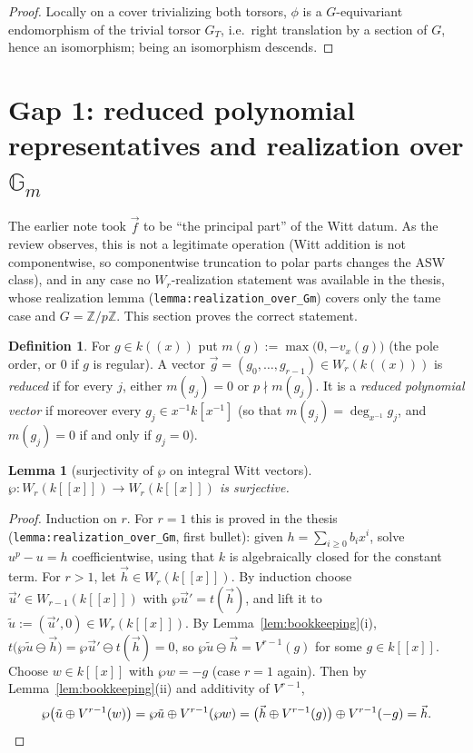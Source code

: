 \documentclass[11pt]{article}
\newcommand{\Z}{\mathbb{Z}}
\newcommand{\bG}{\mathbb{G}}
\newcommand{\AS}{\wp}
\newcommand{\vf}{\vec f}
\theoremstyle{plain}
\newtheorem{lemma}[theorem]{Lemma}
\theoremstyle{definition}
\newtheorem{definition}[theorem]{Definition}
\begin{document}
\begin{proof}
Locally on a cover trivializing both torsors, $\phi$ is a $G$-equivariant endomorphism of
the trivial torsor $G_T$, i.e.\ right translation by a section of $G$, hence an
isomorphism; being an isomorphism descends.
\end{proof}

\section{Gap 1: reduced polynomial representatives and realization over $\bG_m$}

The earlier note took $\vf$ to be ``the principal part'' of the Witt datum. As the review
observes, this is not a legitimate operation (Witt addition is not componentwise, so
componentwise truncation to polar parts changes the ASW class), and in any case no
$W_r$-realization statement was available in the thesis, whose realization lemma
(\texttt{lemma:realization\_over\_Gm}) covers only the tame case and $G=\Z/p\Z$. This
section proves the correct statement.

\begin{definition}\label{def:reduced}
For $g\in k((x))$ put $m(g):=\max\bigl(0,-v_x(g)\bigr)$ (the pole order, or $0$ if $g$ is
regular). A vector $\vec g=(g_0,\dots,g_{r-1})\in W_r(k((x)))$ is \emph{reduced} if for
every $j$, either $m(g_j)=0$ or $p\nmid m(g_j)$. It is a \emph{reduced polynomial vector}
if moreover every $g_j\in x^{-1}k[x^{-1}]$ (so that $m(g_j)=\deg_{x^{-1}}g_j$, and
$m(g_j)=0$ if and only if $g_j=0$).
\end{definition}

\begin{lemma}[surjectivity of $\AS$ on integral Witt vectors]\label{lem:wp-surj}
$\AS\colon W_r(k[[x]])\to W_r(k[[x]])$ is surjective.
\end{lemma}

\begin{proof}
Induction on $r$. For $r=1$ this is proved in the thesis
(\texttt{lemma:realization\_over\_Gm}, first bullet): given
$h=\sum_{i\ge0}b_ix^i$, solve $u^p-u=h$ coefficientwise, using that $k$ is algebraically
closed for the constant term. For $r>1$, let $\vec h\in W_r(k[[x]])$. By induction choose
$\vec u'\in W_{r-1}(k[[x]])$ with $\AS\vec u'=t(\vec h)$, and lift it to
$\tilde u:=(\vec u',0)\in W_r(k[[x]])$. By Lemma~\ref{lem:bookkeeping}(i),
$t\bigl(\AS\tilde u\ominus\vec h\bigr)=\AS\vec u'\ominus t(\vec h)=0$, so
$\AS\tilde u\ominus\vec h=V^{r-1}(g)$ for some $g\in k[[x]]$. Choose $w\in k[[x]]$ with
$\AS w=-g$ (case $r=1$ again). Then by Lemma~\ref{lem:bookkeeping}(ii) and additivity of
$V^{r-1}$,
\[
\AS\bigl(\tilde u\oplus V^{r-1}(w)\bigr)
=\AS\tilde u\oplus V^{r-1}(\AS w)
=\bigl(\vec h\oplus V^{r-1}(g)\bigr)\oplus V^{r-1}(-g)=\vec h. \qedhere
\]
\end{proof}
\end{document}

